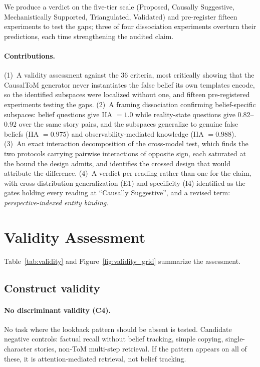 \documentclass{article}
\begin{document}
We produce a verdict on the five-tier scale (Proposed, Causally Suggestive, Mechanistically Supported, Triangulated, Validated) and pre-register fifteen experiments to test the gaps; three of four dissociation experiments overturn their predictions, each time strengthening the audited claim.

\paragraph{Contributions.}
(1)~A validity assessment against the 36 criteria, most critically showing that the CausalToM generator never instantiates the false belief its own templates encode, so the identified subspaces were localized without one, and fifteen pre-registered experiments testing the gaps.
(2)~A framing dissociation confirming belief-specific subspaces: belief questions give IIA $= 1.0$ while reality-state questions give $0.82$--$0.92$ over the same story pairs, and the subspaces generalize to genuine false beliefs (IIA $= 0.975$) and observability-mediated knowledge (IIA $= 0.988$).
(3)~An exact interaction decomposition of the cross-model test, which finds the two protocols carrying pairwise interactions of opposite sign, each saturated at the bound the design admits, and identifies the crossed design that would attribute the difference.
(4)~A verdict per reading rather than one for the claim, with cross-distribution generalization (E1) and specificity (I4) identified as the gates holding every reading at ``Causally Suggestive'', and a revised term: \emph{perspective-indexed entity binding}.


\section{Validity Assessment}
\label{sec:validity}

Table~\ref{tab:validity} and Figure~\ref{fig:validity_grid} summarize the assessment.

\subsection{Construct validity}

\paragraph{No discriminant validity (C4).}
No task where the lookback pattern should be absent is tested. Candidate negative controls: factual recall without belief tracking, simple copying, single-character stories, non-ToM multi-step retrieval. If the pattern appears on all of these, it is attention-mediated retrieval, not belief tracking.
\end{document}
